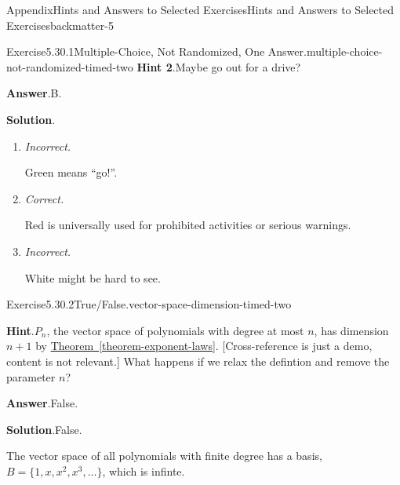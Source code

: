 \documentclass[oneside,10pt,]{book}
\newcommand{\blocktitlefont}{\relax}
\newcommand{\xreffont}{\relax}
\newcommand{\lititle}[1]{{\slshape#1}}
\numberwithin{equation}{section}
\begin{document}
\begin{solutions-chapter}{Appendix}{Hints and Answers to Selected Exercises}{}{Hints and Answers to Selected Exercises}{}{}{backmatter-5}
\begin{divisionsolution}{Exercise}{5.30.1}{Multiple-Choice, Not Randomized, One Answer.}{multiple-choice-not-randomized-timed-two}
\noindent\textbf{\blocktitlefont Hint 2}.\hypertarget{multiple-choice-not-randomized-timed-two-5-back}{}\quad{}Maybe go out for a drive?%
\par\smallskip%
\noindent\textbf{\blocktitlefont Answer}.\hypertarget{multiple-choice-not-randomized-timed-two-6-back}{}\quad{}B.%
\par\smallskip%
\noindent\textbf{\blocktitlefont Solution}.\hypertarget{multiple-choice-not-randomized-timed-two-7-back}{}\quad{}%
\begin{enumerate}[label={\Alph*.}]
\item{}\lititle{Incorrect.}\par%
Green means ``go!''.%
\item{}\lititle{Correct.}\par%
Red is universally used for prohibited activities or serious warnings.%
\item{}\lititle{Incorrect.}\par%
White might be hard to see.%
\end{enumerate}
%
\end{divisionsolution}%
\begin{divisionsolution}{Exercise}{5.30.2}{True\slash{}False.}{vector-space-dimension-timed-two}%
\par\smallskip%
\noindent\textbf{\blocktitlefont Hint}.\hypertarget{vector-space-dimension-timed-two-4-back}{}\quad{}\(P_n\), the vector space of polynomials with degree at most \(n\), has dimension \(n+1\) by \hyperref[theorem-exponent-laws]{Theorem~{\xreffont\ref{theorem-exponent-laws}}}.  [Cross-reference is just a demo, content is not relevant.]  What happens if we relax the defintion and remove the parameter \(n\)?%
\par\smallskip%
\noindent\textbf{\blocktitlefont Answer}.\hypertarget{vector-space-dimension-timed-two-5-back}{}\quad{}False.%
\par\smallskip%
\noindent\textbf{\blocktitlefont Solution}.\hypertarget{vector-space-dimension-timed-two-6-back}{}\quad{}False.%
\par
The vector space of all polynomials with finite degree has a basis, \(B = \{1,x,x^2,x^3,\dots\}\), which is infinte.%
\end{divisionsolution}%
\end{solutions-chapter}
%
%
\typeout{************************************************}
\typeout{************************************************}
%
\end{document}

